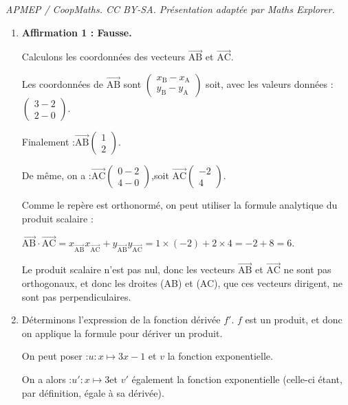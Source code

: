 \documentclass[10pt]{article}
\providecommand{\vectt}[1]{\overrightarrow{\mathrm{#1}}}
\begin{document}
\noindent\textit{APMEP / CoopMaths. CC BY-SA. Présentation adaptée par Maths Explorer.}\par\medskip
\begin{enumerate}
	\item \textbf{Affirmation 1 : Fausse.}

	Calculons les coordonnées des vecteurs $\vectt{AB}$ et $\vectt{AC}$.

	Les coordonnées de $\vectt{AB}$ sont \quad $\begin{pmatrix}x_{\mathrm{B}} - x_{\mathrm{A}}\\ y_{\mathrm{B}} - y_{\mathrm{A}} \end{pmatrix} $
	\quad soit, avec les valeurs données : \quad $\begin{pmatrix} 3 - 2\\2-0 \end{pmatrix} $.

	Finalement :\quad $\vectt{AB} \begin{pmatrix} 1\\2 \end{pmatrix} $.

	De même, on a :\quad $\vectt{AC} \begin{pmatrix} 0 - 2\\4 - 0 \end{pmatrix} $,\quad soit \quad $\vectt{AC} \begin{pmatrix} -2\\4 \end{pmatrix} $.

	Comme le repère est orthonormé, on peut utiliser la formule analytique du produit scalaire :

	$\vectt{AB}\cdot\vectt{AC} = x_{\vectt{AB}}x_{\vectt{AC}} + y_{\vectt{AB}}y_{\vectt{AC}} = 1 \times (-2) + 2 \times 4 = -2 + 8 = 6.$

	Le produit scalaire n'est pas nul, donc les vecteurs $\vectt{AB}$ et $\vectt{AC}$ ne sont pas orthogonaux, et donc les droites (AB) et (AC), que ces vecteurs dirigent, ne sont pas perpendiculaires.

	\item Déterminons l'expression de la fonction dérivée $f'$. $f$ est un produit, et donc on applique la formule pour dériver un produit.

On peut poser :\quad $u : x \longmapsto 3x - 1$ \quad et $v$ la fonction exponentielle.

On a alors :\quad $u': x \longmapsto 3$\quad et $v'$ également la fonction exponentielle (celle-ci étant, par définition, égale à sa dérivée).


\end{enumerate}
\end{document}
